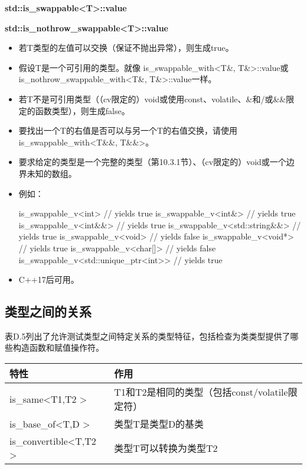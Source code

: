 \textbf{std::is\_swappable<T>::value}

\textbf{std::is\_nothrow\_swappable<T>::value}

\begin{itemize}
\item
若T类型的左值可以交换（保证不抛出异常），则生成true。

\item
假设T是一个可引用的类型。就像 is\_swappable\_with<T\&, T\&>::value或is\_nothrow\_swappable\_with<T\&, T\&>::value一样。

\item
若T不是可引用类型（（cv限定的）void或使用const、volatile、\&和/或\&\&限定的函数类型），则生成false。

\item
要找出一个T的右值是否可以与另一个T的右值交换，请使用is\_swappable\_with<T\&\&, T\&\&>。

\item
要求给定的类型是一个完整的类型（第10.3.1节）、（cv限定的）void或一个边界未知的数组。

\item
例如：
\begin{cpp}
is_swappable_v<int> // yields true
is_swappable_v<int&> // yields true
is_swappable_v<int&&> // yields true
is_swappable_v<std::string&&> // yields true
is_swappable_v<void> // yields false
is_swappable_v<void*> // yields true
is_swappable_v<char[]> // yields false
is_swappable_v<std::unique_ptr<int>> // yields true
\end{cpp}

\item
C++17后可用。
\end{itemize}

\subsection{类型之间的关系}

表D.5列出了允许测试类型之间特定关系的类型特征，包括检查为类类型提供了哪些构造函数和赋值操作符。

\begin{table}[H]
	\begin{center}
	\begin{tabular}{l|l}
		\hline
		\textbf{特性}                                & \textbf{作用}                                                    \\ \hline
		is\_same\textless{}T1,T2 \textgreater{}       & T1和T2是相同的类型（包括const/volatile限定符）\\ \hline
		is\_base\_of\textless{}T,D \textgreater{}     & 类型T是类型D的基类                                     \\ \hline
		is\_convertible\textless{}T,T2 \textgreater{} & 类型T可以转换为类型T2                                 \\ \hline
	\end{tabular}
	\end{center}
\end{table}

